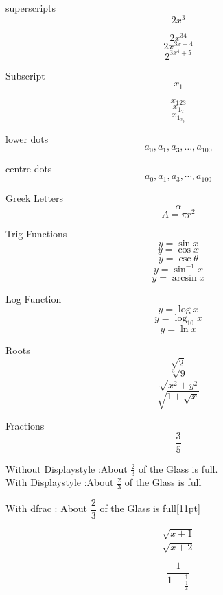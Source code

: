 \documentclass[18]{article}              %
\begin{document}
superscripts $${2x^3}$$                  %

$${2x^{34}}$$                            %
$${2x^{3x+4}}$$                          %
$${2^{3x^4+5}}$$                         %

Subscript
$$x_1$$                                  %

$${x_{123}}$$                            %
$${x_{1_2}}$$                            %
$${x_{1_{2_3}}}$$                        %

lower dots
$${a_0,a_1,a_3,\ldots,a_{100}}$$        %

centre dots
$${a_0,a_1,a_3,\cdots,a_{100}}$$        %

Greek Letters
$$\alpha$$                              %
$$A=\pi r^2$$                           %

Trig Functions
$$y=\sin x$$                            %
$$y=\cos x$$                            %
$$y=\csc \theta$$                       %
$$y=\sin^{-1}x $$                       %
$$y=\arcsin x$$                         %

Log Function
$$y=\log x$$                            %
$$y=\log_{10} x$$                       %
$$y=\ln x$$                             %

Roots
$$\sqrt{2}$$                            %
$$\sqrt[3]{9}$$                         %
$$\sqrt{x^2+y^2}$$                      %
$$\sqrt{ 1+\sqrt{x}  }$$                %

Fractions
$$\frac{3}{5}$$                         %

Without Displaystyle :About $\frac{2}{3}$ of the Glass is full.\\[11pt]     %

With Displaystyle :About $\displaystyle \frac{2}{3}$ of the Glass is full   %

With dfrac : About $\dfrac{2}{3}$ of the Glass is full[11pt]                %

$$\frac{\sqrt{x+1}}{\sqrt{x+2}}$$       %

$$\frac{1}{1+\frac{1}{\frac{1}{x}}}$$   %
\end{document}
